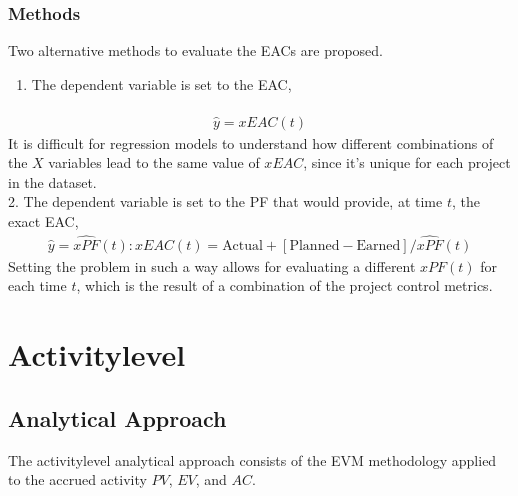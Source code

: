 \documentclass[letterpaper,10pt,english]{jupyterBook}
\begin{document}
\subsubsection{Methods}
\label{\detokenize{PM/eac:methods}}
\sphinxAtStartPar
Two alternative methods to evaluate the EACs are proposed.
\begin{enumerate}
%
\item {} 
\sphinxAtStartPar
The dependent variable is set to the EAC,

\end{enumerate}
\begin{equation*}
\begin{split}
\widehat{y} = \widehat{xEAC}{(t)}
\end{split}
\end{equation*}
\sphinxAtStartPar
It is difficult for regression models to understand how different combinations of the \(X\) variables lead to the same value of \(xEAC\), since it’s unique for each project in the dataset. \\
2. The dependent variable is set to the PF that would provide, at time \(t\), the exact EAC,
\begin{equation*}
\begin{split}
\widehat{y} = \widehat{xPF}{(t)} : xEAC{(t)} = \text{Actual} + [\text{Planned} - \text{Earned}]/\widehat{xPF}{(t)}
\end{split}
\end{equation*}
\sphinxAtStartPar
Setting the problem in such a way allows for evaluating a different \(xPF{(t)}\) for each time \(t\), which is the result of a combination of the project control metrics.


\section{Activity\sphinxhyphen{}level}
\label{\detokenize{PM/eac:activity-level}}

\subsection{Analytical Approach}
\label{\detokenize{PM/eac:id1}}
\sphinxAtStartPar
The activity\sphinxhyphen{}level analytical approach consists of the EVM methodology applied to the accrued activity \(PV\), \(EV\), and \(AC\).
\end{document}
